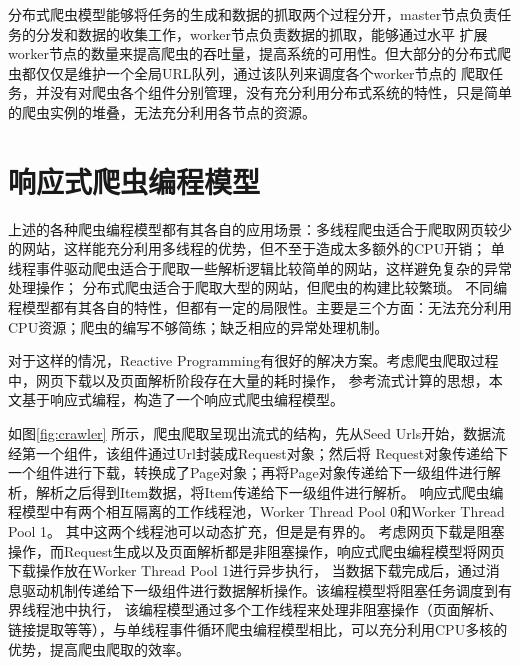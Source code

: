 \documentclass[master]{njuthesis}
\begin{document}
分布式爬虫模型能够将任务的生成和数据的抓取两个过程分开，master节点负责任务的分发和数据的收集工作，worker节点负责数据的抓取，能够通过水平
扩展worker节点的数量来提高爬虫的吞吐量，提高系统的可用性。但大部分的分布式爬虫都仅仅是维护一个全局URL队列，通过该队列来调度各个worker节点的
爬取任务，并没有对爬虫各个组件分别管理，没有充分利用分布式系统的特性，只是简单的爬虫实例的堆叠，无法充分利用各节点的资源。



\section{响应式爬虫编程模型}
上述的各种爬虫编程模型都有其各自的应用场景：多线程爬虫适合于爬取网页较少的网站，这样能充分利用多线程的优势，但不至于造成太多额外的CPU开销；
单线程事件驱动爬虫适合于爬取一些解析逻辑比较简单的网站，这样避免复杂的异常处理操作；
分布式爬虫适合于爬取大型的网站，但爬虫的构建比较繁琐。
不同编程模型都有其各自的特性，但都有一定的局限性。主要是三个方面：无法充分利用CPU资源；爬虫的编写不够简练；缺乏相应的异常处理机制。

对于这样的情况，Reactive Programming有很好的解决方案。考虑爬虫爬取过程中，网页下载以及页面解析阶段存在大量的耗时操作，
参考流式计算的思想，本文基于响应式编程，构造了一个响应式爬虫编程模型。

如图\ref{fig:crawler} 所示，爬虫爬取呈现出流式的结构，先从Seed Urls开始，数据流经第一个组件，该组件通过Url封装成Request对象；然后将
Request对象传递给下一个组件进行下载，转换成了Page对象；再将Page对象传递给下一级组件进行解析，解析之后得到Item数据，将Item传递给下一级组件进行解析。
响应式爬虫编程模型中有两个相互隔离的工作线程池，Worker Thread Pool 0和Worker Thread Pool 1。
其中这两个线程池可以动态扩充，但是是有界的。
考虑网页下载是阻塞操作，而Request生成以及页面解析都是非阻塞操作，响应式爬虫编程模型将网页下载操作放在Worker Thread Pool 1进行异步执行，
当数据下载完成后，通过消息驱动机制传递给下一级组件进行数据解析操作。该编程模型将阻塞任务调度到有界线程池中执行，
该编程模型通过多个工作线程来处理非阻塞操作（页面解析、链接提取等等），与单线程事件循环爬虫编程模型相比，可以充分利用CPU多核的优势，提高爬虫爬取的效率。
\end{document}

